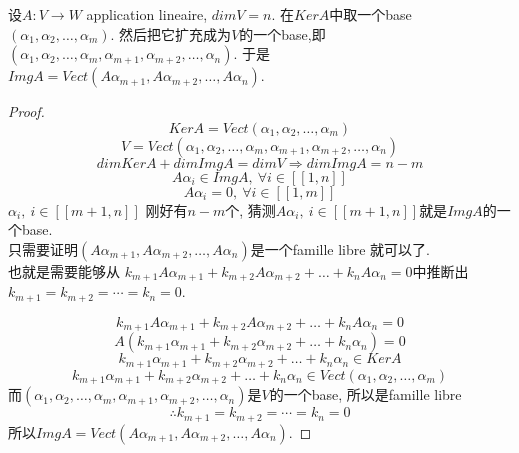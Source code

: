 \begin{theorem}
设$A: V \rightarrow W$ application lineaire, $dim V = n$.
在$KerA$中取一个base $(\alpha_1, \alpha_2, \ldots, \alpha_m)$.
然后把它扩充成为$V$的一个base,即$(\alpha_1, \alpha_2, \ldots, \alpha_m, \alpha_{m + 1}, \alpha_{m + 2}, \ldots, \alpha_n)$.
于是$Img A = Vect(A \alpha_{m + 1}, A \alpha_{m + 2}, \ldots, A \alpha_n)$.
\end{theorem}
\begin{proof}
$$Ker A = Vect(\alpha_1, \alpha_2, \ldots, \alpha_m)$$
$$V = Vect(\alpha_1, \alpha_2, \ldots, \alpha_m, \alpha_{m + 1}, \alpha_{m + 2}, \ldots, \alpha_n)$$
$$dim Ker A + dim Img A = dim V \Rightarrow dim Img A = n - m$$
$$A \alpha_i \in Img A,~ \forall i \in [[1, n]]$$
$$A \alpha_i = 0,~ \forall i \in [[1, m]]$$
$\alpha_i,~ i \in [[m + 1, n]]$ 刚好有$n - m$个, 猜测$A \alpha_i,~ i \in [[m + 1, n]]$就是$Img A$的一个base. \\
只需要证明$(A \alpha_{m + 1}, A \alpha_{m + 2}, \ldots, A \alpha_n)$是一个famille libre 就可以了. \\
也就是需要能够从 $k_{m + 1} A \alpha_{m + 1} + k_{m + 2} A \alpha_{m + 2} + \ldots + k_n A \alpha_n = 0$中推断出 $k_{m + 1} = k_{m + 2} = \cdots = k_n = 0$.

$$k_{m + 1} A \alpha_{m + 1} + k_{m + 2} A \alpha_{m + 2} + \ldots + k_n A \alpha_n = 0$$
$$A(k_{m + 1} \alpha_{m + 1} + k_{m + 2} \alpha_{m + 2} + \ldots + k_n \alpha_n) = 0$$
$$k_{m + 1} \alpha_{m + 1} + k_{m + 2} \alpha_{m + 2} + \ldots + k_n \alpha_n \in Ker A$$
$$k_{m + 1} \alpha_{m + 1} + k_{m + 2} \alpha_{m + 2} + \ldots + k_n \alpha_n \in Vect(\alpha_1, \alpha_2, \ldots, \alpha_m)$$
而$(\alpha_1, \alpha_2, \ldots, \alpha_m, \alpha_{m + 1}, \alpha_{m + 2}, \ldots, \alpha_n)$是$V$的一个base, 所以是famille libre
$$\therefore k_{m + 1} = k_{m + 2} = \cdots = k_n = 0$$
所以$Img A = Vect(A \alpha_{m + 1}, A \alpha_{m + 2}, \ldots, A \alpha_n)$.
\end{proof}

